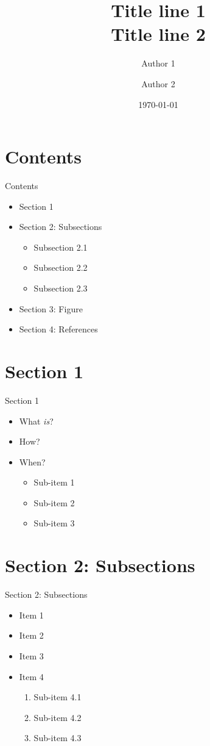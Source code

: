 \documentclass{beamer}
\title{Title line 1\\Title line 2}
\author{Author 1 \and Author 2}
\institute{Institution, City/Country}
\date{\today}
\begin{document}
\begin{frame}
\titlepage
\end{frame}


\section{Contents}
\begin{frame}{Contents}
	\begin{itemize}
	\item Section 1
	\item Section 2: Subsections
		\begin{itemize}
		\item Subsection 2.1
		\item Subsection 2.2
		\item Subsection 2.3
		\end{itemize}
	\item Section 3: Figure
	\item Section 4: References
	\end{itemize}
\end{frame}

\section{Section 1}
\begin{frame}{Section 1}
	\begin{itemize}
	\item<1->What \emph{is}?
	\item<2->How?
	\item<3->When?
		\begin{itemize}
		\item Sub-item 1
		\item Sub-item 2
		\item Sub-item 3
		\end{itemize}
	\end{itemize}
\end{frame}

\section{Section 2: Subsections}
\begin{frame}{Section 2: Subsections}
	\begin{itemize}
	\item Item 1
	\item Item 2
	\item Item 3
	\item Item 4
		\begin{enumerate}
		\item Sub-item 4.1
		\item Sub-item 4.2
		\item Sub-item 4.3
		\end{enumerate}
	\end{itemize}
\end{frame}
\end{document}

